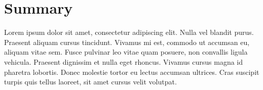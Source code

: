 \vspace{-0.3cm}

\section{Summary}\label{sec:5.6}
\vspace{-0.5cm}
\noindent Lorem ipsum dolor sit amet, consectetur adipiscing elit. Nulla vel blandit purus. Praesent aliquam cursus tincidunt. Vivamus mi est, commodo ut accumsan eu, aliquam vitae sem. Fusce pulvinar leo vitae quam posuere, non convallis ligula vehicula. Praesent dignissim et nulla eget rhoncus. Vivamus cursus magna id pharetra lobortis. Donec molestie tortor eu lectus accumsan ultrices. Cras suscipit turpis quis tellus laoreet, sit amet cursus velit volutpat.

\vspace{-0.3cm}
